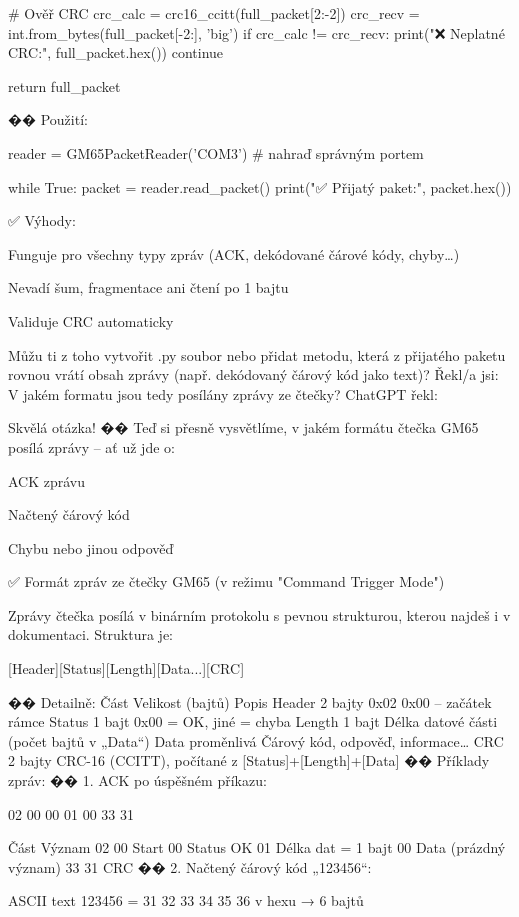                     # Ověř CRC
                    crc_calc = crc16_ccitt(full_packet[2:-2])
                    crc_recv = int.from_bytes(full_packet[-2:], 'big')
                    if crc_calc != crc_recv:
                        print("❌ Neplatné CRC:", full_packet.hex())
                        continue

                    return full_packet

�� Použití:

reader = GM65PacketReader('COM3')  # nahraď správným portem

while True:
    packet = reader.read_packet()
    print("✅ Přijatý paket:", packet.hex())

✅ Výhody:

    Funguje pro všechny typy zpráv (ACK, dekódované čárové kódy, chyby…)

    Nevadí šum, fragmentace ani čtení po 1 bajtu

    Validuje CRC automaticky

Můžu ti z toho vytvořit .py soubor nebo přidat metodu, která z přijatého paketu rovnou vrátí obsah zprávy (např. dekódovaný čárový kód jako text)?
Řekl/a jsi:
V jakém formatu jsou tedy posílány zprávy ze čtečky?
ChatGPT řekl:

Skvělá otázka! ��
Teď si přesně vysvětlíme, v jakém formátu čtečka GM65 posílá zprávy – ať už jde o:

    ACK zprávu

    Načtený čárový kód

    Chybu nebo jinou odpověď

✅ Formát zpráv ze čtečky GM65 (v režimu "Command Trigger Mode")

Zprávy čtečka posílá v binárním protokolu s pevnou strukturou, kterou najdeš i v dokumentaci. Struktura je:

[Header][Status][Length][Data...][CRC]

�� Detailně:
Část	Velikost (bajtů)	Popis
Header	2 bajty	0x02 0x00 – začátek rámce
Status	1 bajt	0x00 = OK, jiné = chyba
Length	1 bajt	Délka datové části (počet bajtů v „Data“)
Data	proměnlivá	Čárový kód, odpověď, informace…
CRC	2 bajty	CRC-16 (CCITT), počítané z [Status]+[Length]+[Data]
�� Příklady zpráv:
�� 1. ACK po úspěšném příkazu:

02 00 00 01 00 33 31

Část	Význam
02 00	Start
00	Status OK
01	Délka dat = 1 bajt
00	Data (prázdný význam)
33 31	CRC
�� 2. Načtený čárový kód „123456“:

ASCII text 123456 = 31 32 33 34 35 36 v hexu → 6 bajtů

